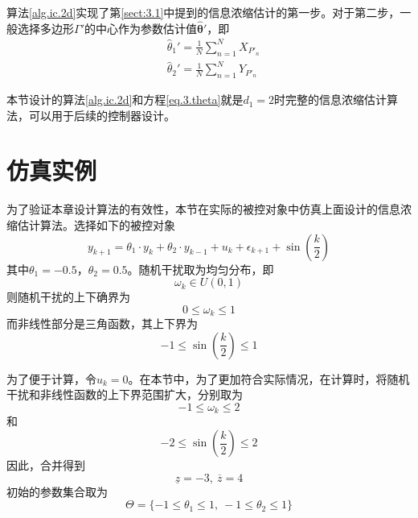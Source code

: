 算法\ref{alg.ic.2d}实现了第\ref{sect:3.1}中提到的信息浓缩估计的第一步。对于第二步，一般选择多边形$\Gamma'$的中心作为参数估计值$\hat{\bm{\theta}}'$，即
\begin{equation}\label{eq.3.theta}
\begin{split}%
&\hat{\theta}_{1}'=\frac1N\sum_{n=1}^{N}X_{P'_{n}}\\
&\hat{\theta}_{2}'=\frac1N\sum_{n=1}^{N}Y_{P'_{n}}
\end{split}
\end{equation}

本节设计的算法\ref{alg.ic.2d}和方程\eqref{eq.3.theta}就是$d_{1}=2$时完整的信息浓缩估计算法，可以用于后续的控制器设计。

\section{仿真实例}\label{sect:3.4}
为了验证本章设计算法的有效性，本节在实际的被控对象中仿真上面设计的信息浓缩估计算法。选择如下的被控对象
\begin{equation}
\label{eq.3.sys.eq}
y_{k+1}=\theta_{1}\cdot y_{k} +\theta_{2}\cdot y_{k-1}+u_{k}+\epsilon_{k+1}+\sin(\frac{k}2)
\end{equation}
其中$\theta_{1}=-0.5$，$\theta_{2}=0.5$。随机干扰取为均匀分布，即
\begin{equation*}
\omega_{k}\in U(0,1) 
\end{equation*}
则随机干扰的上下确界为
\begin{equation*}
0\leq\omega_{k}\leq1
\end{equation*}
而非线性部分是三角函数，其上下界为
\begin{equation*}
-1\leq\sin(\frac{k}2)\leq1
\end{equation*}

为了便于计算，令$u_{k}=0$。在本节中，为了更加符合实际情况，在计算时，将随机干扰和非线性函数的上下界范围扩大，分别取为
\begin{equation*}
-1\leq\omega_{k}\leq2
\end{equation*}
和
\begin{equation*}
-2\leq\sin(\frac{k}2)\leq2
\end{equation*}
因此，合并得到
\begin{equation*}
\underline{z}=-3,\ \overline{z}=4
\end{equation*}
初始的参数集合取为
\begin{equation*}%
\Theta=\{-1\leq\theta_{1}\leq1,\ -1\leq\theta_{2}\leq1\}
\end{equation*}

